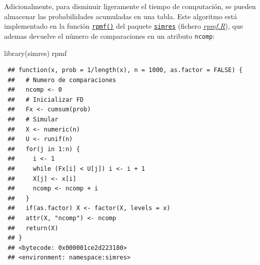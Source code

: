 \documentclass[
  10pt,
]{book}
\newenvironment{Shaded}{\begin{snugshade}}{\end{snugshade}}
\newcommand{\FunctionTok}[1]{\textcolor[rgb]{0.00,0.00,0.00}{#1}}
\newcommand{\NormalTok}[1]{#1}
\theoremstyle{break}
\theoremstyle{nonumberplain}
\begin{document}
Adicionalmente, para disminuir ligeramente el tiempo de computación, se pueden almacenar las probabilidades acumuladas en una tabla.
Este algoritmo está implementado en la función \href{https://rubenfcasal.github.io/simres/reference/rpmf.html}{\texttt{rpmf()}} del paquete \href{https://rubenfcasal.github.io/simres}{\texttt{simres}} (fichero \href{R/rpmf.R}{\emph{rpmf.R}}), que ademas devuelve el número de comparaciones en un atributo \texttt{ncomp}:

\begin{Shaded}
\begin{Highlighting}[]
\FunctionTok{library}\NormalTok{(simres)}
\NormalTok{rpmf}
\end{Highlighting}
\end{Shaded}

\begin{verbatim}
 ## function(x, prob = 1/length(x), n = 1000, as.factor = FALSE) {
 ##   # Numero de comparaciones
 ##   ncomp <- 0
 ##   # Inicializar FD
 ##   Fx <- cumsum(prob)
 ##   # Simular
 ##   X <- numeric(n)
 ##   U <- runif(n)
 ##   for(j in 1:n) {
 ##     i <- 1
 ##     while (Fx[i] < U[j]) i <- i + 1
 ##     X[j] <- x[i]
 ##     ncomp <- ncomp + i
 ##   }
 ##   if(as.factor) X <- factor(X, levels = x)
 ##   attr(X, "ncomp") <- ncomp
 ##   return(X)
 ## }
 ## <bytecode: 0x000001ce2d223180>
 ## <environment: namespace:simres>
\end{verbatim}
\end{document}

